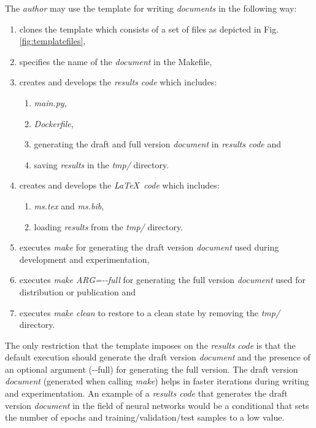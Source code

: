 \documentclass[journal]{IEEEtran}
\begin{document}
The \textit{author} may use the template for writing \textit{documents} in the following way:
\begin{enumerate}
	\item clones the template which consists of a set of files as depicted in Fig.\ref{fig:templatefiles},
	\item specifies the name of the \textit{document} in the Makefile,
	\item creates and develops the \textit{results code} which includes:
		\begin{enumerate}
			\item \textit{main.py},
			\item \textit{Dockerfile},
			\item generating the draft and full version \textit{document} in \textit{results code} and
			\item saving \textit{results} in the \textit{tmp/} directory.
		\end{enumerate}
	\item creates and develops the \textit{\LaTeX\ code} which includes:
		\begin{enumerate}
			\item \textit{ms.tex} and \textit{ms.bib},
			\item loading \textit{results} from the \textit{tmp/} directory.
		\end{enumerate}
	\item executes \textit{make} for generating the draft version \textit{document} used during development and experimentation,
	\item executes \textit{make ARG=-{}-full} for generating the full version \textit{document} used for distribution or publication and
	\item executes \textit{make clean} to restore to a clean state by removing the \textit{tmp/} directory.
\end{enumerate}

The only restriction that the template imposes on the \textit{results code} is that the default execution should generate the draft version \textit{document} and the presence of an optional argument (-{}-full) for generating the full version.
The draft version \textit{document} (generated when calling \textit{make}) helps in faster iterations during writing and experimentation.
An example of a \textit{results code} that generates the draft version \textit{document} in the field of neural networks would be a conditional that sets the number of epochs and training/validation/test samples to a low value.
\end{document}
